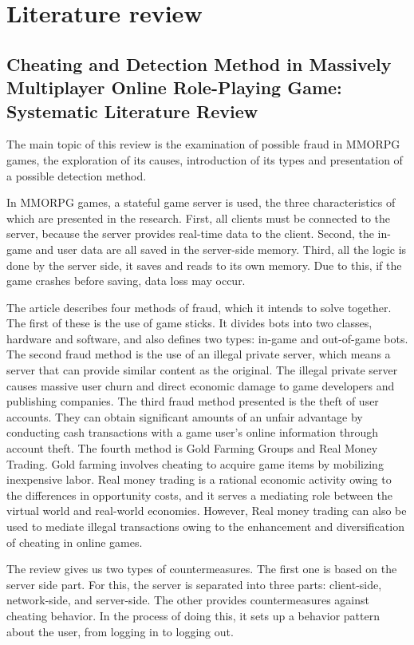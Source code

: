 \chapter{Literature review}
\label{ch:lit_rev}

\section{Cheating and Detection Method in Massively Multiplayer Online Role-Playing Game: Systematic Literature Review \cite{9766355}}

The main topic of this review is the examination of possible fraud in MMORPG games, the exploration of its causes, introduction of its types and presentation of a possible detection method.

In MMORPG games, a stateful game server is used, the three characteristics of which are presented in the research. First, all clients must be connected to the server, because the server provides real-time data to the client. Second, the in-game and user data are all saved in the server-side memory. Third, all the logic is done by the server side, it saves and reads to its own memory. Due to this, if the game crashes before saving, data loss may occur.

The article describes four methods of fraud, which it intends to solve together. The first of these is the use of game sticks. It divides bots into two classes, hardware and software, and also defines two types: in-game and out-of-game bots. The second fraud method is the use of an illegal private server, which means a server that can provide similar content as the original. The illegal private server causes massive user churn and direct economic damage to game developers and publishing companies. The third fraud method presented is the theft of user accounts. They can obtain significant amounts of an unfair advantage by conducting cash transactions with a game user's online information through account theft. The fourth method is Gold Farming Groups and Real Money Trading. Gold farming involves cheating to acquire game items by mobilizing inexpensive labor. Real money trading is a rational economic activity owing to the differences in opportunity costs, and it serves a mediating role between the virtual world and real-world economies. However, Real money trading can also be used to mediate illegal transactions owing to the enhancement and diversification of cheating in online games.
 
The review gives us two types of countermeasures. The first one is based on the server side part. For this, the server is separated into three parts: client-side, network-side, and server-side.
The other provides countermeasures against cheating behavior. In the process of doing this, it sets up a behavior pattern about the user, from logging in to logging out.

